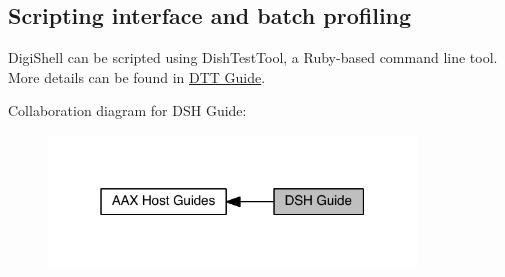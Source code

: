  \hypertarget{a00365_dsh_guide_04_scripting_interface_and_batch_profiling}{}\subsection{Scripting interface and batch profiling}\label{a00365_dsh_guide_04_scripting_interface_and_batch_profiling}
 Digi\+Shell can be scripted using Dish\+Test\+Tool, a Ruby-\/based command line tool. More details can be found in \hyperlink{a00366}{D\+T\+T Guide}.

 Collaboration diagram for D\+S\+H Guide\+:
\nopagebreak
\begin{figure}[H]
\begin{center}
\leavevmode
\includegraphics[width=277pt]{a00365}
\end{center}
\end{figure}
